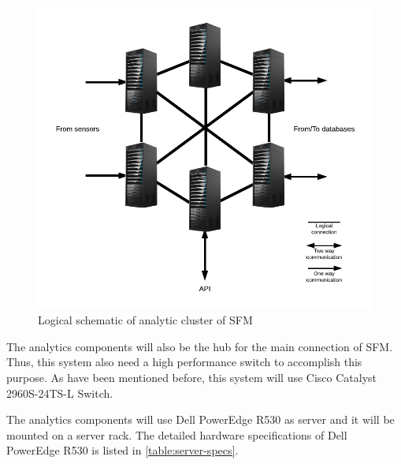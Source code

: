 \begin{figure}[hb!]
\centering
\includegraphics[]{6-hardware/images/analytic-cluster.png}
\caption{Logical schematic of analytic cluster of SFM}
\label{fig:analytic-cluster}
\end{figure}

The analytics components will also be the hub for the main connection of SFM. Thus, this system also need a high performance switch to accomplish this purpose. As have been mentioned before, this system will use Cisco Catalyst 2960S-24TS-L Switch.

The analytics components will use Dell PowerEdge R530 as server and it will be mounted on a server rack. The detailed hardware specifications of Dell PowerEdge R530 is listed in \autoref{table:server-specs}.

